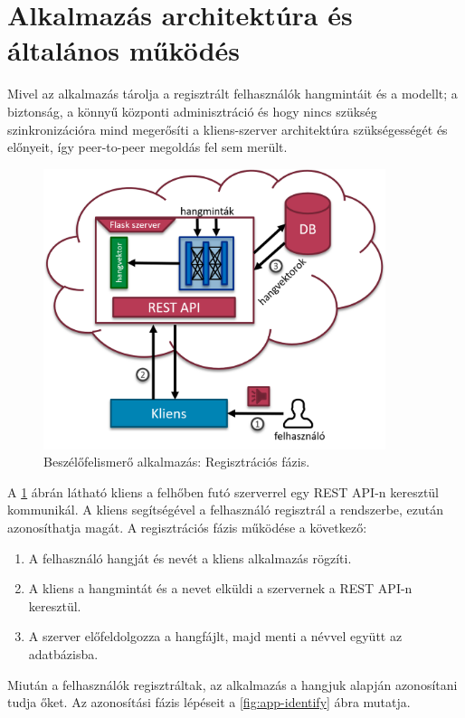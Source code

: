 \section{Alkalmazás architektúra és általános működés}

Mivel az alkalmazás tárolja a regisztrált felhasználók hangmintáit és a modellt; a biztonság, a könnyű központi adminisztráció és hogy nincs szükség szinkronizációra mind megerősíti a kliens-szerver architektúra szükségességét és előnyeit, így peer-to-peer megoldás fel sem merült.

\begin{figure}[!ht]
	\centering
	\includegraphics[width=100mm, keepaspectratio]{figures/app-register.png}
	\caption{Beszélőfelismerő alkalmazás: Regisztrációs fázis.}
	\label{fig:app-register}
\end{figure}

A \ref{fig:app-register} ábrán látható kliens a felhőben futó szerverrel egy REST API-n keresztül kommunikál. A kliens segítségével a felhasználó regisztrál a rendszerbe, ezután azonosíthatja magát. A regisztrációs fázis működése a következő:

\begin{enumerate}
	\item A felhasználó hangját és nevét a kliens alkalmazás rögzíti.
	\item A kliens a hangmintát és a nevet elküldi a szervernek a REST API-n keresztül.
	\item A szerver előfeldolgozza a hangfájlt, majd menti a névvel együtt az adatbázisba.
\end{enumerate}

Miután a felhasználók regisztráltak, az alkalmazás a hangjuk alapján azonosítani tudja őket. Az azonosítási fázis lépéseit a \ref{fig:app-identify} ábra mutatja.

